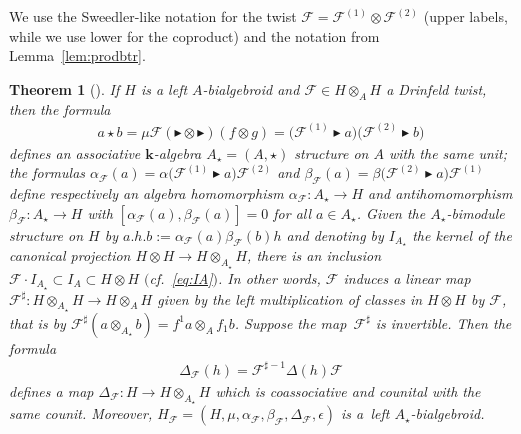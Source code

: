 \documentclass[10pt,a4paper]{amsart}
\newtheorem{Theorem}{Theorem}[section]
\numberwithin{equation}{section}
\begin{document}
We use the Sweedler-like notation for the twist $\mathcal{F} = \mathcal{F}^{(1)}\otimes\mathcal{F}^{(2)}$ (upper labels, while we use lower for the coproduct) and the notation from Lemma~\ref{lem:prodbtr}.
\begin{Theorem}[\cite{xu}]\label{th:cocycimpltw}
If $H$ is a left $A$-bialgebroid and $\mathcal{F}\in H\otimes_A H$ a Drinfeld twist, then the formula
\begin{gather}\label{eq:starfromF}
a\star b = \mu\mathcal{F}(\blacktriangleright\otimes\blacktriangleright)(f\otimes g) = \big(\mathcal{F}^{(1)}\blacktriangleright a\big) \big(\mathcal{F}^{(2)}\blacktriangleright b\big)
\end{gather}
defines an associative $\mathbf{k}$-algebra $A_\star = (A,\star)$ structure on $A$ with the same unit; the formulas $\alpha_{\mathcal{F}}(a) = \alpha\big(\mathcal{F}^{(1)}\blacktriangleright a\big)\mathcal{F}^{(2)}$ and $\beta_{\mathcal{F}}(a) = \beta\big(\mathcal{F}^{(2)}\blacktriangleright a\big)\mathcal{F}^{(1)}$ define respectively an algebra homomorphism $\alpha_{\mathcal{F}}\colon A_\star\to H$ and antihomomorphism $\beta_{\mathcal{F}}\colon A_\star\to H$ with $[\alpha_{\mathcal{F}}(a),\beta_{\mathcal{F}}(a)] = 0$ for all $a\in A_\star$. Given the $A_\star$-bimodule structure on $H$ by $a.h.b := \alpha_{\mathcal{F}}(a)\beta_{\mathcal{F}}(b)h$ and denoting by $I_{A_\star}$ the kernel of the canonical projection $H\otimes H\to H\otimes_{A_\star} H$, there is an inclusion $\mathcal{F} \cdot I_{A_\star}\subset I_A \subset H\otimes H$ $($cf.~\eqref{eq:IA}$)$. In other words, $\mathcal{F}$ induces a linear map $\mathcal{F}^\sharp\colon H\otimes_{A_\star} H\to H\otimes_{A}H$ given by the left multiplication of classes in $H\otimes H$ by $\mathcal{F}$, that is by $\mathcal{F}^\sharp(a\otimes_{A_\star} b) = f^1 a\otimes_{A} f_1 b$. Suppose the map~$\mathcal{F}^\sharp$ is invertible. Then the formula
\begin{gather*}
\Delta_{\mathcal{F}}(h) = \mathcal{F}^{\sharp -1}\Delta(h)\mathcal{F}
\end{gather*}
defines a map $\Delta_{\mathcal{F}}\colon H\to H\otimes_{A_\star} H$ which is coassociative and counital with the same counit. Moreover, $H_{\mathcal{F}} = (H,\mu,\alpha_{\mathcal{F}},\beta_{\mathcal{F}},\Delta_{\mathcal{F}},\epsilon)$ is a~left $A_\star$-bialgebroid.
\end{Theorem}
\end{document}
